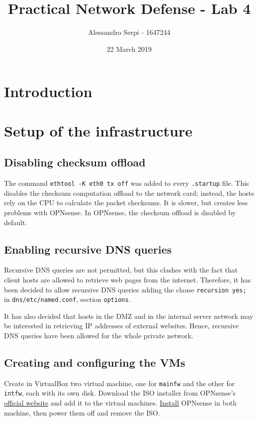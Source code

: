 \documentclass[draft]{homework}
\title{Practical Network Defense - Lab 4}
\author{Alessandro Serpi - 1647244}
\date{22 March 2019}
\newcommand{\intfw}{\texttt{intfw}\xspace}
\newcommand{\mainfw}{\texttt{mainfw}\xspace}
\newcommand{\opn}{OPNsense\xspace}
\newcommand{\vb}{VirtualBox\xspace}
\begin{document}
    \maketitle
    \tableofcontents
    
    
    \section{Introduction}
    
    
    \section{Setup of the infrastructure}
    \subsection{Disabling checksum offload}
    The command \texttt{ethtool -K eth0 tx off} was added to every \texttt{.startup} file. This disables the checksum computation offload to the network card; instead, the hosts rely on the CPU to calculate the packet checksums. It is slower, but creates less problems with \opn.
    In \opn, the checksum offload is disabled by default.
    
    \subsection{Enabling recursive DNS queries}
    Recursive DNS queries are not permitted, but this clashes with the fact that client hosts are allowed to retrieve web pages from the internet. Therefore, it has been decided to allow recursive DNS queries adding the clause \texttt{recursion yes;} in \texttt{dns/etc/named.conf}, section \texttt{options}.
    
    It has also decided that hosts in the DMZ and in the internal server network may be interested in retrieving IP addresses of external websites. Hence, recursive DNS queries have been allowed for the whole private network.
    
    \subsection{Creating and configuring the VMs}
    Create in \vb two virtual machine, one for \mainfw and the other for \intfw, each with its own disk. Download the ISO installer from \opn's \href{https://opnsense.org/download/}{official website} and add it to the virtual machines. \href{https://docs.opnsense.org/manual/install.html}{Install} \opn in both machine, then power them off and remove the ISO.
    
\end{document}
